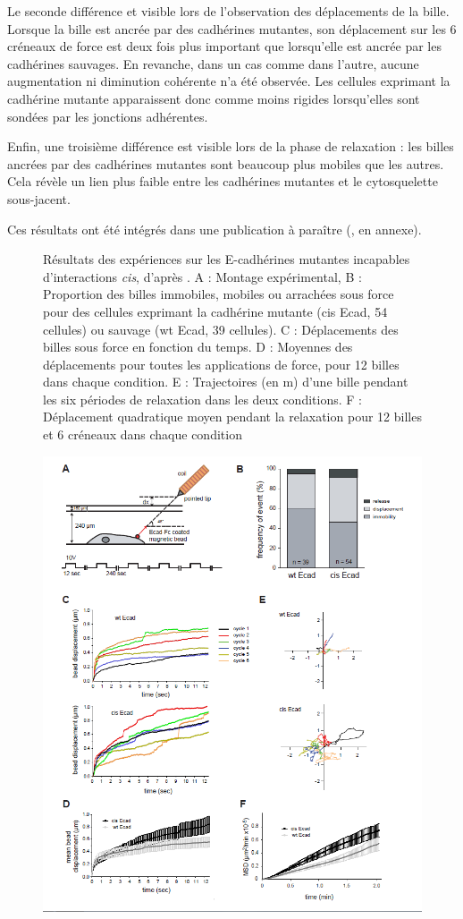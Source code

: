  Le seconde différence et visible lors de l'observation des déplacements de la bille. Lorsque la bille est ancrée par des cadhérines mutantes, son déplacement sur les 6 créneaux de force est deux fois plus important que lorsqu'elle est ancrée par les cadhérines sauvages. En revanche, dans un cas comme dans l'autre, aucune augmentation ni diminution cohérente n'a été observée. Les cellules exprimant la cadhérine mutante apparaissent donc comme moins rigides lorsqu'elles sont sondées par les jonctions adhérentes. 
 
 Enfin, une troisième différence est visible lors de la phase de relaxation : les billes ancrées par des cadhérines mutantes sont beaucoup plus mobiles que les autres. Cela révèle un lien plus faible entre les cadhérines mutantes et le cytosquelette sous-jacent. 

 Ces résultats ont été intégrés dans une publication à paraître (\cite{strale_formation_2012}, en annexe).


 \begin{figure}[h!]
\caption{\small Résultats des expériences sur les E-cadhérines mutantes incapables d'interactions \textit{cis}, d'après \cite{Strale}. A : Montage expérimental, B : Proportion des billes immobiles, mobiles ou arrachées sous force pour des cellules exprimant la cadhérine mutante (cis Ecad, 54 cellules) ou sauvage (wt Ecad, 39 cellules). C : Déplacements des billes sous force en fonction du temps. D : Moyennes des déplacements pour toutes les applications de force, pour 12 billes dans chaque condition. E : Trajectoires (en \micro m) d'une bille pendant les six périodes de relaxation dans les deux conditions. F : Déplacement quadratique moyen pendant la relaxation pour 12 billes et 6 créneaux dans chaque condition}
\end{figure} 
     
 \begin{figure}
 \includegraphics[scale=0.7]{Figures/Strale.png} 

 \end{figure}


 
 
 
 
%
